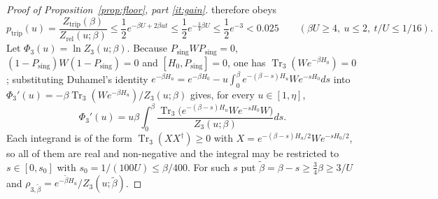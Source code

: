 \documentclass[11pt]{article}
\theoremstyle{plain}
\theoremstyle{definition}
\DeclareMathOperator{\Tr}{Tr}
\begin{document}
\begin{proof}[Proof of Proposition~\ref{prop:floor}, part \ref{it:gain}]
therefore obeys
\begin{equation}\label{eq:ptrip}
p_{\mathrm{trip}}(u)=\frac{Z_{\mathrm{trip}}(\beta)}{Z_{\mathrm{rel}}(u;\beta)}
\le\frac12e^{-\beta U+2\beta ut}\le\frac12e^{-\frac34\beta U}\le\frac12e^{-3}<0.025
\qquad(\beta U\ge4,\ u\le2,\ t/U\le1/16).
\end{equation}
Let $\Phi_3(u)=\ln Z_3(u;\beta)$. Because $P_{\mathrm{sing}}WP_{\mathrm{sing}}=0$,
$(1-P_{\mathrm{sing}})W(1-P_{\mathrm{sing}})=0$ and $[H_0,P_{\mathrm{sing}}]=0$, one
has $\Tr_3(We^{-\beta H_0})=0$; substituting Duhamel's identity
$e^{-\beta H_u}=e^{-\beta H_0}-u\int_0^{\beta}e^{-(\beta-s)H_u}We^{-sH_0}ds$ into
$\Phi_3'(u)=-\beta\Tr_3(We^{-\beta H_u})/Z_3(u;\beta)$ gives, for every
$u\in[1,\eta]$,
\begin{equation}\label{eq:duhamel}
\Phi_3'(u)=u\beta\int_0^{\beta}\frac{\Tr_3\bigl(e^{-(\beta-s)H_u}We^{-sH_0}W\bigr)}{Z_3(u;\beta)}ds .
\end{equation}
Each integrand is of the form $\Tr_3(XX^\dagger)\ge0$ with
$X=e^{-(\beta-s)H_u/2}We^{-sH_0/2}$, so all of them are real and non-negative and
the integral may be restricted to $s\in[0,s_0]$ with $s_0=1/(100U)\le\beta/400$.
For such $s$ put $\tilde\beta=\beta-s\ge\frac34\beta\ge3/U$ and
$\rho_{3,\tilde\beta}=e^{-\tilde\beta H_u}/Z_3(u;\tilde\beta)$.


\end{proof}
\end{document}
